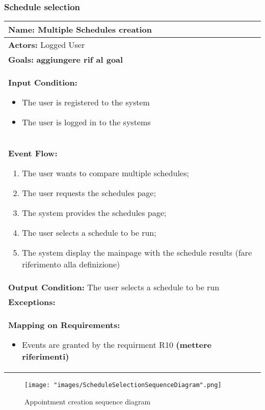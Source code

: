 \subsubsection{Schedule selection}
\begin{longtable}{|p{14cm}|} \hline
\textbf{Name:} Multiple Schedules creation \\ \hline
\textbf{Actors:} Logged User \\ \hline
\textbf{Goals:} \textbf{aggiungere rif al goal} \\ \hline
\textbf{Input Condition:} 
\begin{itemize}
\item The user is registered to the system 
\item The user is logged in to the systems 
\end{itemize}
\\ \hline
\textbf{Event Flow:}
\begin{enumerate}
\item The user wants to compare multiple schedules;
\item The user requests the schedules page;
\item The system provides the schedules page;
\item The user selects a schedule to be run;
\item The system display the mainpage with the schedule results (fare riferimento alla definizione)
\end{enumerate}	\\ \hline
\textbf{Output Condition:} The user selects a schedule to be run \\ \hline
\textbf{Exceptions:}
\\ \hline
\textbf{Mapping on Requirements:}
\begin{itemize}
\item Events are granted by the requirment R10 \textbf{(mettere riferimenti)}
\end{itemize}  \\ \hline

\end{longtable}
\label{usecase:ScheduleSelection}

\begin{figure}[H]
\begin{center}
\texttt{[image: "images/ScheduleSelectionSequenceDiagram".png]}
\caption{Appointment creation sequence diagram}
\label{img:ScheduleSelection}
\end{center}
\end{figure}

